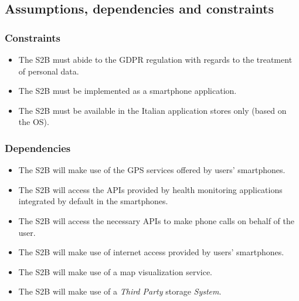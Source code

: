 \documentclass[titlepage]{article}
\begin{document}
	\subsection{Assumptions, dependencies and constraints}
		\subsubsection{Constraints}
		\begin{itemize}
		\item The S2B must abide to the GDPR regulation with regards to the treatment of personal data.
\item The S2B must be implemented as a smartphone application.
\item The S2B must be available in the Italian application stores only (based on the OS).

		\end{itemize}
		\subsubsection{Dependencies}
		\begin{itemize}
		\item The S2B will make use of the GPS services offered by users’ smartphones.
\item The S2B will access the APIs provided by health monitoring applications integrated by default in the smartphones.
\item The S2B will access the necessary APIs to make phone calls on behalf of the user.
\item The S2B will make use of internet access provided by users’ smartphones. 
\item The S2B will make use of a map visualization service.
\item The S2B will make use of a {\it Third Party} storage {\it System}.
		\end{itemize}
		
\end{document}

